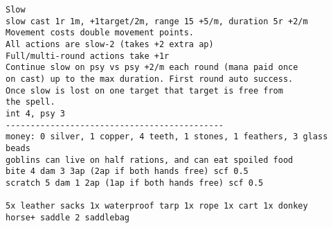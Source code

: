 \begin{samepage}
\begin{verbatim}
Slow
slow cast 1r 1m, +1target/2m, range 15 +5/m, duration 5r +2/m
Movement costs double movement points.
All actions are slow-2 (takes +2 extra ap)
Full/multi-round actions take +1r
Continue slow on psy vs psy +2/m each round (mana paid once
on cast) up to the max duration. First round auto success.
Once slow is lost on one target that target is free from
the spell.
int 4, psy 3
--------------------------------------------
money: 0 silver, 1 copper, 4 teeth, 1 stones, 1 feathers, 3 glass beads
goblins can live on half rations, and can eat spoiled food
bite 4 dam 3 3ap (2ap if both hands free) scf 0.5
scratch 5 dam 1 2ap (1ap if both hands free) scf 0.5

5x leather sacks 1x waterproof tarp 1x rope 1x cart 1x donkey
horse+ saddle 2 saddlebag
\end{verbatim} \end{samepage} \normalsize








